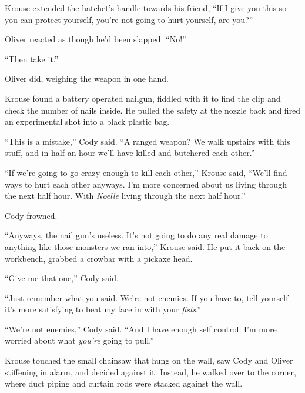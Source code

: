 Krouse extended the hatchet's handle towards his friend, ``If I give you this so you can protect yourself, you're not going to hurt yourself, are you?''



Oliver reacted as though he'd been slapped.  ``No!''



``Then take it.''



Oliver did, weighing the weapon in one hand.



Krouse found a battery operated nailgun, fiddled with it to find the clip and check the number of nails inside.  He pulled the safety at the nozzle back and fired an experimental shot into a black plastic bag.



``This is a mistake,'' Cody said.  ``A ranged weapon?  We walk upstairs with this stuff, and in half an hour we'll have killed and butchered each other.''



``If we're going to go crazy enough to kill each other,'' Krouse said, ``We'll find ways to hurt each other anyways.  I'm more concerned about us living through the next half hour.  With \emph{Noelle} living through the next half hour.''



Cody frowned.



``Anyways, the nail gun's useless.  It's not going to do any real damage to anything like those monsters we ran into,'' Krouse said.  He put it back on the workbench, grabbed a crowbar with a pickaxe head.



``Give me that one,'' Cody said.



``Just remember what you said.  We're not enemies.  If you have to, tell yourself it's more satisfying to beat my face in with your \emph{fists}.''



``We're not enemies,'' Cody said.  ``And I have enough self control.  I'm more worried about what \emph{you're} going to pull.''



Krouse touched the small chainsaw that hung on the wall, saw Cody and Oliver stiffening in alarm, and decided against it.  Instead, he walked over to the corner, where duct piping and curtain rods were stacked against the wall.



